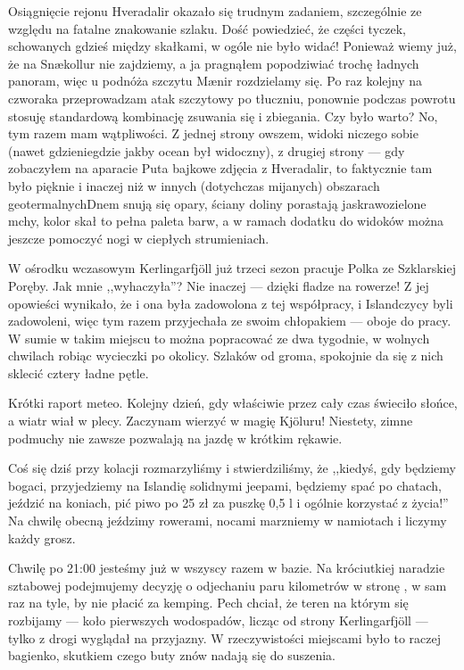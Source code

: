 Osiągnięcie rejonu Hveradalir okazało się trudnym zadaniem, szczególnie ze względu na fatalne znakowanie szlaku. Dość powiedzieć, że części tyczek, schowanych gdzieś między skałkami, w ogóle nie było widać! Ponieważ wiemy już, że na Snækollur nie zajdziemy, a ja pragnąłem popodziwiać trochę ładnych panoram, więc u podnóża szczytu Mænir rozdzielamy się. Po raz kolejny na czworaka przeprowadzam atak szczytowy po tłuczniu, ponownie podczas powrotu stosuję standardową kombinację zsuwania się i zbiegania. Czy było warto? No, tym razem mam wątpliwości. Z jednej strony owszem, widoki niczego sobie (nawet gdzieniegdzie jakby ocean był widoczny), z drugiej strony --- gdy zobaczyłem na aparacie Puta bajkowe zdjęcia z Hveradalir, to faktycznie tam było pięknie i inaczej niż w innych (dotychczas mijanych) obszarach geotermalnych\textellipsis Dnem snują się opary, ściany doliny porastają jaskrawozielone mchy, kolor skał to pełna paleta barw, a w ramach dodatku do widoków można jeszcze pomoczyć nogi w ciepłych strumieniach.

W ośrodku wczasowym Kerlingarfjöll już trzeci sezon pracuje Polka ze Szklarskiej Poręby. Jak mnie ,,wyhaczyła''? Nie inaczej --- dzięki fladze na rowerze! Z jej opowieści wynikało, że i ona była zadowolona z tej współpracy, i Islandczycy byli zadowoleni, więc tym razem przyjechała ze swoim chłopakiem --- oboje do pracy. W sumie w takim miejscu to można popracować ze dwa tygodnie, w wolnych chwilach robiąc wycieczki po okolicy. Szlaków od groma, spokojnie da się z nich sklecić cztery ładne pętle.


Krótki raport meteo. Kolejny dzień, gdy właściwie przez cały czas świeciło słońce, a wiatr wiał w plecy. Zaczynam wierzyć w magię Kjöluru! Niestety, zimne podmuchy nie zawsze pozwalają na jazdę w krótkim rękawie.

Coś się dziś przy kolacji rozmarzyliśmy i stwierdziliśmy, że ,,kiedyś, gdy będziemy bogaci, przyjedziemy na Islandię solidnymi jeepami, będziemy spać po chatach, jeździć na koniach, pić piwo po 25 zł za puszkę 0,5 l i ogólnie korzystać z życia!'' Na chwilę obecną jeździmy rowerami, nocami marzniemy w namiotach i liczymy każdy grosz.

Chwilę po 21:00 jesteśmy już w wszyscy razem w bazie. Na króciutkiej naradzie sztabowej podejmujemy decyzję o odjechaniu paru kilometrów w stronę , w sam raz na tyle, by nie płacić za kemping. Pech chciał, że teren na którym się rozbijamy --- koło pierwszych wodospadów, licząc od strony Kerlingarfjöll --- tylko z drogi wyglądał na przyjazny. W rzeczywistości miejscami było to raczej bagienko, skutkiem czego buty znów nadają się do suszenia.

